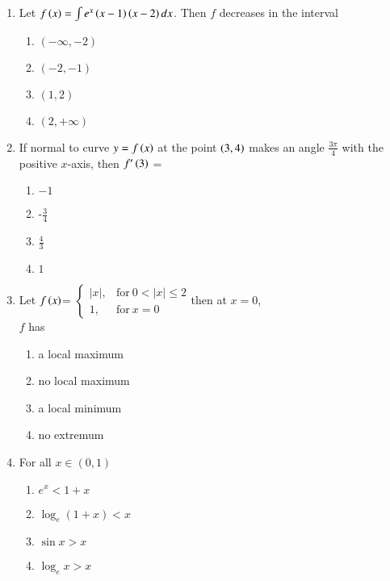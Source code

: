 \documentclass[journal]{IEEEtran}
\begin{document}
\begin{enumerate}[start=9]
\item Let $f\left(x\right)=\int e^x\left(x-1\right)\left(x-2\right)dx$. Then $f$ decreases in the interval 
\hfill {}
\begin{multicols}{3}
\begin{enumerate}
    \item $(-\infty,-2)$
    \item $(-2,-1)$
    \item $(1,2)$
    \item $(2,+\infty)$\\
\end{enumerate}
\end{multicols}
\item If normal to curve $y=f\left(x\right)$ at the point $\left(3,4\right)$ makes an angle $\displaystyle\frac{3\pi}{4}$ with the positive $x$-axis, then $f'\left(3\right)$ = \hfill{}
\begin{multicols}{2}
\begin{enumerate}
    \item $-1$
    \item -$\displaystyle\frac{3}{4}$\\
    \item $\displaystyle\frac{4}{3}$
    \item $1$
\end{enumerate}
\end{multicols}
\item Let $f\left(x\right)$=
$\begin{cases}
|x|, & \text{for} \ 0<|x| \leq 2\\ 
1, & \text{for}\  x=0
\end{cases}$then at $x=0$, \\$f$ has
\hfill {}
\begin{enumerate}
    \item a local maximum
    \item no local maximum
    \item a local minimum
    \item no extremum\\
\end{enumerate}
\item For all $x\in(0,1)$
\hfill {}
\begin{enumerate}
    \item $e^{x} <1+x$
    \item $\log_e{(1+x)} < x$
    \item $ \sin{x} > x$
    \item $ \log_e{x} > x $\\

\end{enumerate}
\end{enumerate}
\end{document}
